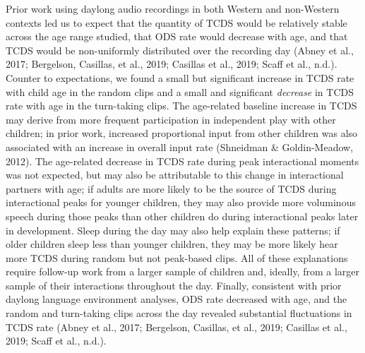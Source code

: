 \documentclass[
  english,
  ,man,floatsintext]{apa6}
\begin{document}
Prior work using daylong audio recordings in both Western and non-Western contexts led us to expect that the quantity of TCDS would be relatively stable across the age range studied, that ODS rate would decrease with age, and that TCDS would be non-uniformly distributed over the recording day (Abney et al., 2017; Bergelson, Casillas, et al., 2019; Casillas et al., 2019; Scaff et al., n.d.). Counter to expectations, we found a small but significant increase in TCDS rate with child age in the random clips and a small and significant \emph{decrease} in TCDS rate with age in the turn-taking clips. The age-related baseline increase in TCDS may derive from more frequent participation in independent play with other children; in prior work, increased proportional input from other children was also associated with an increase in overall input rate (Shneidman \& Goldin-Meadow, 2012). The age-related decrease in TCDS rate during peak interactional moments was not expected, but may also be attributable to this change in interactional partners with age; if adults are more likely to be the source of TCDS during interactional peaks for younger children, they may also provide more voluminous speech during those peaks than other children do during interactional peaks later in development. Sleep during the day may also help explain these patterns; if older children sleep less than younger children, they may be more likely hear more TCDS during random but not peak-based clips. All of these explanations require follow-up work from a larger sample of children and, ideally, from a larger sample of their interactions throughout the day. Finally, consistent with prior daylong language environment analyses, ODS rate decreased with age, and the random and turn-taking clips across the day revealed substantial fluctuations in TCDS rate (Abney et al., 2017; Bergelson, Casillas, et al., 2019; Casillas et al., 2019; Scaff et al., n.d.).
\end{document}
